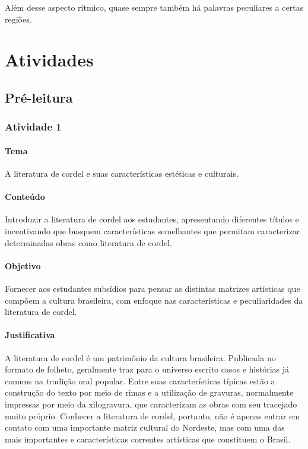 \documentclass[11pt]{extarticle}
\begin{document}
Além desse aspecto rítmico, quase sempre também há palavras peculiares a certas
regiões. 


\section{Atividades}

\subsection{Pré-leitura}

\subsubsection{Atividade 1}


\paragraph{Tema} A literatura de cordel e suas características estéticas e culturais.

\paragraph{Conteúdo} Introduzir a literatura de cordel aos estudantes, apresentando diferentes títulos e incentivando que busquem características semelhantes que permitam caracterizar determinadas obras como literatura de cordel.

\paragraph{Objetivo} Fornecer aos estudantes subsídios para pensar as distintas matrizes artísticas que compõem a cultura brasileira, com enfoque nas características e peculiaridades da literatura de cordel.

\paragraph{Justificativa} A literatura de cordel é um patrimônio da cultura brasileira. Publicada no formato de folheto, geralmente traz para o universo escrito casos e histórias já comuns na tradição oral popular. Entre suas características típicas estão a construção do texto por meio de rimas e a utilização de gravuras, normalmente impressas por meio da xilogravura, que caracterizam as obras com seu tracejado muito próprio. Conhecer a literatura de cordel, portanto, não é apenas entrar em contato com uma importante matriz cultural do Nordeste, mas com uma das mais importantes e características correntes artísticas que constituem o Brasil.
\end{document}
